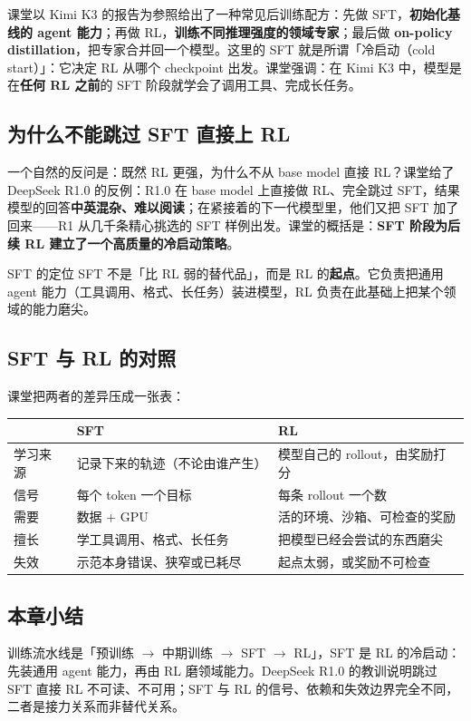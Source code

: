 \documentclass[a4paper]{article}
\begin{document}
课堂以 Kimi K3 的报告为参照给出了一种常见后训练配方：先做 SFT，\textbf{初始化基线的 agent 能力}；再做 RL，\textbf{训练不同推理强度的领域专家}；最后做 \textbf{on-policy distillation}，把专家合并回一个模型。这里的 SFT 就是所谓「冷启动（cold start）」：它决定 RL 从哪个 checkpoint 出发。课堂强调：在 Kimi K3 中，模型是在\textbf{任何 RL 之前}的 SFT 阶段就学会了调用工具、完成长任务。

\subsection{为什么不能跳过 SFT 直接上 RL}

一个自然的反问是：既然 RL 更强，为什么不从 base model 直接 RL？课堂给了 DeepSeek R1.0 的反例：R1.0 在 base model 上直接做 RL、完全跳过 SFT，结果模型的回答\textbf{中英混杂、难以阅读}；在紧接着的下一代模型里，他们又把 SFT 加了回来——R1 从几千条精心挑选的 SFT 样例出发。课堂的概括是：\textbf{SFT 阶段为后续 RL 建立了一个高质量的冷启动策略}。

\begin{importantbox}{SFT 的定位}
SFT 不是「比 RL 弱的替代品」，而是 RL 的\textbf{起点}。它负责把通用 agent 能力（工具调用、格式、长任务）装进模型，RL 负责在此基础上把某个领域的能力磨尖。
\end{importantbox}

\subsection{SFT 与 RL 的对照}

课堂把两者的差异压成一张表：

\begin{center}
\begin{tabular}{p{2.4cm}p{5.0cm}p{5.0cm}}
\toprule
 & SFT & RL \\
\midrule
学习来源 & 记录下来的轨迹（不论由谁产生） & 模型自己的 rollout，由奖励打分 \\
信号 & 每个 token 一个目标 & 每条 rollout 一个数 \\
需要 & 数据 + GPU & 活的环境、沙箱、可检查的奖励 \\
擅长 & 学工具调用、格式、长任务 & 把模型已经会尝试的东西磨尖 \\
失效 & 示范本身错误、狭窄或已耗尽 & 起点太弱，或奖励不可检查 \\
\bottomrule
\end{tabular}
\end{center}

\subsection{本章小结}
训练流水线是「预训练 $\rightarrow$ 中期训练 $\rightarrow$ SFT $\rightarrow$ RL」，SFT 是 RL 的冷启动：先装通用 agent 能力，再由 RL 磨领域能力。DeepSeek R1.0 的教训说明跳过 SFT 直接 RL 不可读、不可用；SFT 与 RL 的信号、依赖和失效边界完全不同，二者是接力关系而非替代关系。
\end{document}
